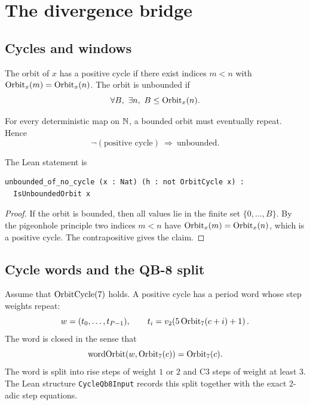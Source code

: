 \section{The divergence bridge}\label{sec:bridge}

\subsection{Cycles and windows}

\begin{definition}\label{def:cycle}
The orbit of $x$ has a positive cycle if there exist indices
$m<n$ with $\mathrm{Orbit}_x(m)=\mathrm{Orbit}_x(n)$.  The orbit is unbounded if
\begin{equation*}
  \forall B,\ \exists n,\ B\le \mathrm{Orbit}_x(n).
\end{equation*}
\end{definition}

\begin{proposition}\label{prop:nocycle}
For every deterministic map on $\mathbb{N}$, a bounded orbit must eventually
repeat.  Hence
\begin{equation*}
  \neg(\text{positive cycle})\ \Longrightarrow\ \text{unbounded}.
\end{equation*}
\end{proposition}

The Lean statement is
\begin{verbatim}
unbounded_of_no_cycle (x : Nat) (h : not OrbitCycle x) :
  IsUnboundedOrbit x
\end{verbatim}

\begin{proof}
If the orbit is bounded, then all values lie in the finite set
$\{0,\dots,B\}$.  By the pigeonhole principle two indices $m<n$ have
$\mathrm{Orbit}_x(m)=\mathrm{Orbit}_x(n)$, which is a positive cycle.  The
contrapositive gives the claim.
\end{proof}

\subsection{Cycle words and the QB-8 split}

Assume that $\mathrm{OrbitCycle}(7)$ holds.  A positive cycle has a period word
whose step weights repeat:
\begin{equation*}
  w=(t_0,\dots,t_{P-1}),\qquad
  t_i=v_2\!\left(5\,\mathrm{Orbit}_7(c+i)+1\right).
\end{equation*}
The word is closed in the sense that
\begin{equation*}
  \mathrm{wordOrbit}(w,\mathrm{Orbit}_7(c))=\mathrm{Orbit}_7(c).
\end{equation*}
The word is split into rise steps of weight $1$ or $2$ and C3 steps of
weight at least $3$.  The Lean structure
\texttt{CycleQb8Input} records this split together with the exact
2-adic step equations.


